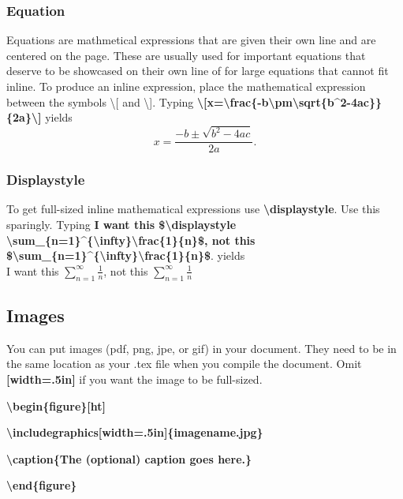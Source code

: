 \documentclass{article}
\begin{document}
\subsubsection{Equation}
Equations are mathmetical expressions that are given their own line and are centered on the page. These are usually used for important equations that deserve to be showcased on their own line of for large equations that cannot fit inline. To produce an inline expression, place the mathematical expression between the symbols \textbackslash[ and \textbackslash]. Typing \textbf{\textbackslash[x=\textbackslash frac\{-b\textbackslash pm\textbackslash sqrt\{b\textasciicircum2-4ac\}\}\{2a\}\textbackslash]} yields \[x=\frac{-b\pm\sqrt{b^2-4ac}}{2a}.\]


\subsubsection{Displaystyle}
To get full-sized inline mathematical expressions use \textbf{\textbackslash displaystyle}. 
Use this sparingly. 
Typing \textbf{I want this \$\textbackslash displaystyle \textbackslash sum\_\{n=1\}\textasciicircum\{\textbackslash infty\}\textbackslash frac\{1\}\{n\}\$, not this \$\textbackslash sum\_\{n=1\}\textasciicircum\{\textbackslash infty\}\textbackslash frac\{1\}\{n\}\$}. 
yields\\

I want this $\displaystyle \sum_{n=1}^\infty \frac{1}{n}$, not this $\sum_{n=1}^\infty \frac{1}{n}$

\subsection{Images}
You can put images (pdf, png, jpe, or gif) in your document. 
They need to be in the same location as your .tex file when you compile the document. 
Omit \textbf{[width=.5in]} if you want the image to be full-sized.
\vspace{1em}

\textbf{\textbackslash begin\{figure\}[ht]}

\textbf{\textbackslash includegraphics[width=.5in]\{imagename.jpg\}}

\textbf{\textbackslash caption\{The (optional) caption goes here.\}}

\textbf{\textbackslash end\{figure\}}
\end{document}
